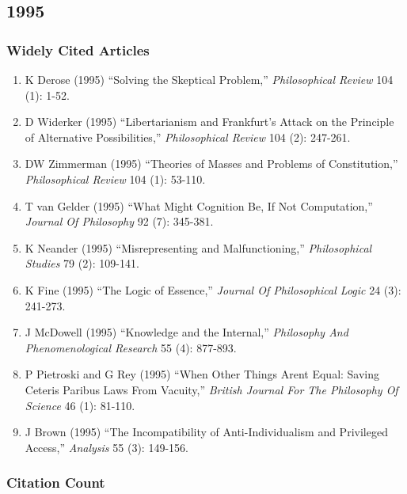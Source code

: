 \documentclass[
  10pt,
  letterpaper,
  DIV=11,
  numbers=noendperiod,
  twoside]{scrartcl}
\providecommand{\tightlist}{%
  \setlength{\itemsep}{0pt}\setlength{\parskip}{0pt}}\usepackage{longtable,booktabs,array}
\begin{document}
\newpage

\subsection{1995}\label{sec-s1995}

\subsubsection*{Widely Cited Articles}\label{widely-cited-articles-39}

\begin{enumerate}
\def\labelenumi{\arabic{enumi}.}
\tightlist
\item
  K Derose (1995) ``Solving the Skeptical Problem,'' \emph{Philosophical
  Review} 104 (1): 1-52.
\item
  D Widerker (1995) ``Libertarianism and Frankfurt's Attack on the
  Principle of Alternative Possibilities,'' \emph{Philosophical Review}
  104 (2): 247-261.
\item
  DW Zimmerman (1995) ``Theories of Masses and Problems of
  Constitution,'' \emph{Philosophical Review} 104 (1): 53-110.
\item
  T van Gelder (1995) ``What Might Cognition Be, If Not Computation,''
  \emph{Journal Of Philosophy} 92 (7): 345-381.
\item
  K Neander (1995) ``Misrepresenting and Malfunctioning,''
  \emph{Philosophical Studies} 79 (2): 109-141.
\item
  K Fine (1995) ``The Logic of Essence,'' \emph{Journal Of Philosophical
  Logic} 24 (3): 241-273.
\item
  J McDowell (1995) ``Knowledge and the Internal,'' \emph{Philosophy And
  Phenomenological Research} 55 (4): 877-893.
\item
  P Pietroski and G Rey (1995) ``When Other Things Arent Equal: Saving
  Ceteris Paribus Laws From Vacuity,'' \emph{British Journal For The
  Philosophy Of Science} 46 (1): 81-110.
\item
  J Brown (1995) ``The Incompatibility of Anti-Individualism and
  Privileged Access,'' \emph{Analysis} 55 (3): 149-156.
\end{enumerate}

\subsubsection*{Citation Count}\label{sec-count-1995}
\end{document}
